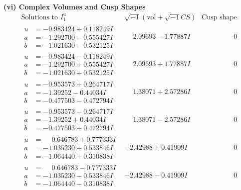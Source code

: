 \documentclass[1p]{elsarticle_modified}
\theoremstyle{definition}
\newcommand{\I}{\sqrt{-1}}
\begin{document}
\newpage\flushleft \textbf{(vi) Complex Volumes and Cusp Shapes}
$$\begin{array}{c|c|c}  
\text{Solutions to }I^u_{1}& \I (\text{vol} + \sqrt{-1}CS) & \text{Cusp shape}\\
 \hline 
\begin{aligned}
u &= -0.983424 + 0.118249 I \\
a &= -1.292700 - 0.555427 I \\
b &= -1.021630 - 0.532125 I\end{aligned}
 & \phantom{-}2.09693 - 1.77887 I & \phantom{-0.000000 } 0 \\ \hline\begin{aligned}
u &= -0.983424 - 0.118249 I \\
a &= -1.292700 + 0.555427 I \\
b &= -1.021630 + 0.532125 I\end{aligned}
 & \phantom{-}2.09693 + 1.77887 I & \phantom{-0.000000 } 0 \\ \hline\begin{aligned}
u &= -0.953573 + 0.264717 I \\
a &= -1.39252 - 0.44034 I \\
b &= -0.477503 - 0.472794 I\end{aligned}
 & \phantom{-}1.38071 + 2.57286 I & \phantom{-0.000000 } 0 \\ \hline\begin{aligned}
u &= -0.953573 - 0.264717 I \\
a &= -1.39252 + 0.44034 I \\
b &= -0.477503 + 0.472794 I\end{aligned}
 & \phantom{-}1.38071 - 2.57286 I & \phantom{-0.000000 } 0 \\ \hline\begin{aligned}
u &= \phantom{-}0.646783 + 0.777333 I \\
a &= -1.035230 + 0.533846 I \\
b &= -1.064440 + 0.310838 I\end{aligned}
 & -2.42988 + 0.41909 I & \phantom{-0.000000 } 0 \\ \hline\begin{aligned}
u &= \phantom{-}0.646783 - 0.777333 I \\
a &= -1.035230 - 0.533846 I \\
b &= -1.064440 - 0.310838 I\end{aligned}
 & -2.42988 - 0.41909 I & \phantom{-0.000000 } 0 \\ \hline\begin{aligned}

\end{aligned}
\end{array}$$
\end{document}
